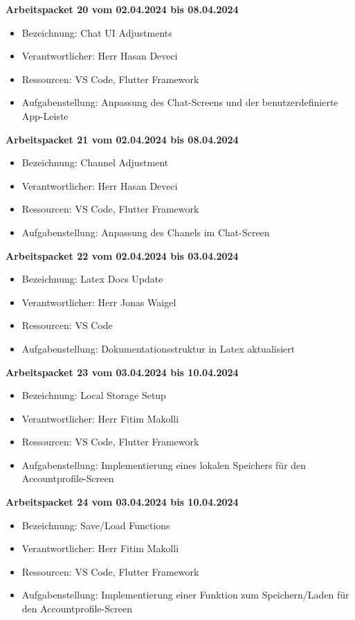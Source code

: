 \textbf{Arbeitspacket 20 vom 02.04.2024 bis 08.04.2024}
\begin{itemize}[itemsep=0pt]
    \item{Bezeichnung: Chat UI Adjustments} 
	\item{Verantwortlicher: Herr Hasan Deveci} 
	\item{Ressourcen: VS Code, Flutter Framework} 
    \item{Aufgabenstellung: Anpassung des Chat-Screens und der benutzerdefinierte App-Leiste}
\end{itemize}

\textbf{Arbeitspacket 21 vom 02.04.2024 bis 08.04.2024}
\begin{itemize}[itemsep=0pt]
    \item{Bezeichnung: Channel Adjustment} 
	\item{Verantwortlicher: Herr Hasan Deveci} 
	\item{Ressourcen: VS Code, Flutter Framework} 
    \item{Aufgabenstellung: Anpassung des Chanels im Chat-Screen}
\end{itemize}

\textbf{Arbeitspacket 22 vom 02.04.2024 bis 03.04.2024}
\begin{itemize}[itemsep=0pt]
    \item{Bezeichnung: Latex Docs Update} 
	\item{Verantwortlicher: Herr Jonas Waigel} 
	\item{Ressourcen: VS Code} 
    \item{Aufgabenstellung: Dokumentationsstruktur in Latex aktualisiert}
\end{itemize} 

\textbf{Arbeitspacket 23 vom 03.04.2024 bis 10.04.2024}
\begin{itemize}[itemsep=0pt]
    \item{Bezeichnung: Local Storage Setup} 
	\item{Verantwortlicher: Herr Fitim Makolli} 
	\item{Ressourcen: VS Code, Flutter Framework} 
    \item{Aufgabenstellung: Implementierung eines lokalen Speichers für den Accountprofile-Screen}
\end{itemize}

\textbf{Arbeitspacket 24 vom 03.04.2024 bis 10.04.2024}
\begin{itemize}[itemsep=0pt]
    \item{Bezeichnung: Save/Load Functions} 
	\item{Verantwortlicher: Herr Fitim Makolli} 
	\item{Ressourcen: VS Code, Flutter Framework} 
    \item{Aufgabenstellung: Implementierung einer Funktion zum Speichern/Laden für den Accountprofile-Screen}
\end{itemize}

